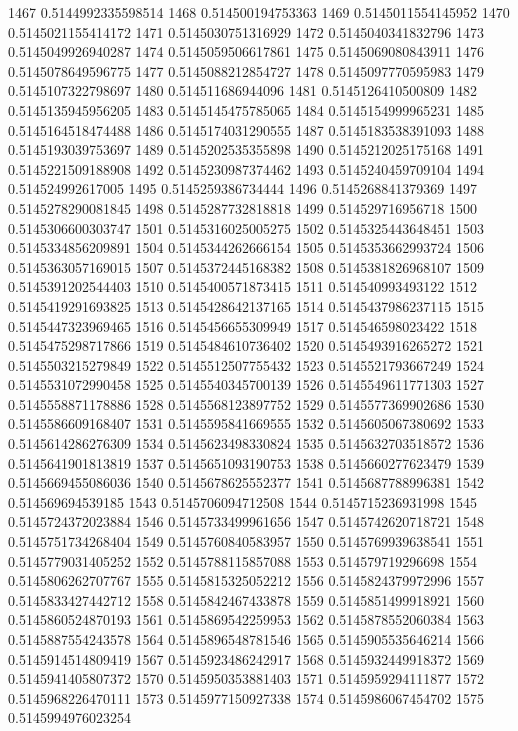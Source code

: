 1467 0.5144992335598514
1468 0.514500194753363
1469 0.5145011554145952
1470 0.5145021155414172
1471 0.5145030751316929
1472 0.5145040341832796
1473 0.5145049926940287
1474 0.5145059506617861
1475 0.5145069080843911
1476 0.5145078649596775
1477 0.5145088212854727
1478 0.5145097770595983
1479 0.5145107322798697
1480 0.514511686944096
1481 0.5145126410500809
1482 0.5145135945956205
1483 0.5145145475785065
1484 0.5145154999965231
1485 0.5145164518474488
1486 0.5145174031290555
1487 0.5145183538391093
1488 0.5145193039753697
1489 0.5145202535355898
1490 0.5145212025175168
1491 0.5145221509188908
1492 0.5145230987374462
1493 0.5145240459709104
1494 0.514524992617005
1495 0.5145259386734444
1496 0.5145268841379369
1497 0.5145278290081845
1498 0.5145287732818818
1499 0.514529716956718
1500 0.5145306600303747
1501 0.5145316025005275
1502 0.5145325443648451
1503 0.5145334856209891
1504 0.5145344262666154
1505 0.5145353662993724
1506 0.5145363057169015
1507 0.5145372445168382
1508 0.5145381826968107
1509 0.5145391202544403
1510 0.5145400571873415
1511 0.514540993493122
1512 0.5145419291693825
1513 0.5145428642137165
1514 0.5145437986237115
1515 0.5145447323969465
1516 0.5145456655309949
1517 0.514546598023422
1518 0.5145475298717866
1519 0.5145484610736402
1520 0.5145493916265272
1521 0.5145503215279849
1522 0.5145512507755432
1523 0.5145521793667249
1524 0.5145531072990458
1525 0.5145540345700139
1526 0.5145549611771303
1527 0.5145558871178886
1528 0.5145568123897752
1529 0.5145577369902686
1530 0.5145586609168407
1531 0.5145595841669555
1532 0.5145605067380692
1533 0.5145614286276309
1534 0.5145623498330824
1535 0.5145632703518572
1536 0.5145641901813819
1537 0.5145651093190753
1538 0.5145660277623479
1539 0.5145669455086036
1540 0.5145678625552377
1541 0.5145687788996381
1542 0.514569694539185
1543 0.5145706094712508
1544 0.5145715236931998
1545 0.5145724372023884
1546 0.5145733499961656
1547 0.5145742620718721
1548 0.5145751734268404
1549 0.5145760840583957
1550 0.5145769939638541
1551 0.5145779031405252
1552 0.5145788115857088
1553 0.514579719296698
1554 0.5145806262707767
1555 0.5145815325052212
1556 0.5145824379972996
1557 0.5145833427442712
1558 0.5145842467433878
1559 0.5145851499918921
1560 0.5145860524870193
1561 0.5145869542259953
1562 0.5145878552060384
1563 0.5145887554243578
1564 0.5145896548781546
1565 0.5145905535646214
1566 0.5145914514809419
1567 0.5145923486242917
1568 0.5145932449918372
1569 0.5145941405807372
1570 0.5145950353881403
1571 0.5145959294111877
1572 0.5145968226470111
1573 0.5145977150927338
1574 0.5145986067454702
1575 0.5145994976023254
